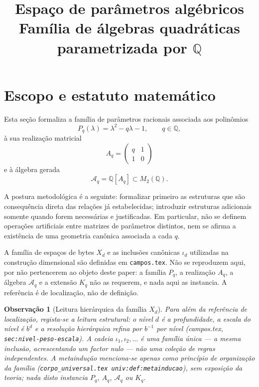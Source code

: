 \documentclass[11pt,a4paper]{article}
\title{Espaço de parâmetros algébricos\\
\large Família de álgebras quadráticas parametrizada por \(\mathbb{Q}\)}
\author{}
\date{}
\newtheorem{observacao}{Observação}
\newcommand{\code}[1]{\texttt{\small #1}}
\begin{document}
\maketitle

\section{Escopo e estatuto matemático}

Esta seção formaliza a família de parâmetros racionais associada aos polinômios
\[
P_q(\lambda)=\lambda^2-q\lambda-1,\qquad q\in\mathbb{Q},
\]
à sua realização matricial
\[
A_q=\begin{pmatrix}q&1\\1&0\end{pmatrix}
\]
e à álgebra gerada
\[
\mathcal{A}_q=\mathbb{Q}[A_q]\subset M_2(\mathbb{Q}).
\]

A postura metodológica é a seguinte: formalizar primeiro as estruturas que são
consequência direta das relações já estabelecidas; introduzir estruturas
adicionais somente quando forem necessárias e justificadas. Em particular,
não se definem operações artificiais entre matrizes de parâmetros distintos,
nem se afirma a existência de uma geometria canônica associada a cada \(q\).

A família de espaços de bytes \(X_d\) e as inclusões canônicas \(\iota_d\)
utilizadas na construção dimensional são definidas em \texttt{campos.tex}. Não
se reproduzem aqui, por não pertencerem ao objeto deste paper: a família
\(P_q\), a realização \(A_q\), a álgebra \(\mathcal{A}_q\) e a extensão \(K_q\)
não as requerem, e nada aqui as instancia. A referência é de localização, não de
definição.

\begin{observacao}[Leitura hierárquica da família \(X_d\)]
\label{obs:espaco-xd-hierarquia}
Para além da referência de localização, regista-se a leitura estrutural: o nível
\(d\) é a profundidade, a escala do nível é \(b^d\) e a resolução hierárquica
refina por \(b^{-1}\) por nível (campos.tex, \texttt{sec:nivel-peso-escala}). A
cadeia \(\iota_1,\iota_2,\dots\) é uma família única --- a mesma inclusão,
acrescentando um factor nulo --- não uma coleção de regras independentes. A
metaindução menciona-se apenas como princípio de organização da família
(\code{corpo\_universal.tex univ:def:metainducao}), sem exposição da teoria; nada
disto instancia \(P_q\), \(A_q\), \(\mathcal{A}_q\) ou \(K_q\).
\end{observacao}
\end{document}
